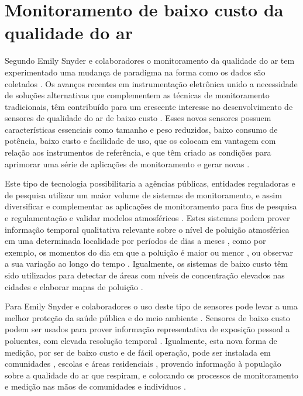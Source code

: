 \section{Monitoramento de baixo custo da qualidade do ar}\label{section:low-cost-air-quality-monit}

Segundo Emily Snyder e colaboradores  o monitoramento da qualidade do ar tem experimentado uma mudança de paradigma na forma como os dados são coletados \cite{Snyder2013}. Os avanços recentes em instrumentação eletrônica unido a necessidade de soluções alternativas que complementem as técnicas de monitoramento tradicionais, têm contribuído para um crescente interesse no desenvolvimento de sensores de qualidade do ar de baixo custo \cite{Kumar2015,Lewis2018Low-costApplications}. Esses novos sensores possuem características essenciais como tamanho e peso reduzidos, baixo consumo de potência, baixo custo e facilidade de uso, que os colocam em vantagem com relação aos instrumentos de referência, e que têm criado as condições para aprimorar uma série de aplicações de monitoramento e gerar novas \cite{Snyder2013,Lewis2018Low-costApplications}.

Este tipo de tecnologia possibilitaria a agências públicas, entidades reguladoras e de pesquisa utilizar um maior volume de sistemas de monitoramento, e assim diversificar e complementar as aplicações de monitoramento para fins de pesquisa e regulamentação e validar modelos atmosféricos \cite{Lewis2018Low-costApplications}. Estes sistemas podem prover informação temporal qualitativa relevante sobre o nível de poluição atmosférica em uma determinada localidade por períodos de dias a meses \cite{Castell2018LocalizedNodes}, como por exemplo, os momentos do dia em que a poluição é maior ou menor \cite{Zimmerman2018AMonitoring}, ou observar a sua variação ao longo do tempo \cite{Castell2017CanEstimates}. Igualmente, os sistemas de baixo custo têm sido utilizados para detectar de áreas com níveis de concentração elevados nas cidades \cite{Mead2013TheNetworks} e elaborar mapas de poluição \cite{Huang2019EstimatingMeasurements}.

Para Emily Snyder e colaboradores o uso deste tipo de sensores pode levar a uma melhor proteção da saúde pública e do meio ambiente \cite{Snyder2013}. Sensores de baixo custo podem ser usados para prover informação representativa de exposição pessoal a poluentes, com elevada resolução temporal \cite{Mead2013TheNetworks,Jerrett2017ValidatingScience}. Igualmente, esta nova forma de medição, por ser de baixo custo e de fácil operação, pode ser instalada em comunidades \cite{Mahajan2020APollution}, escolas e áreas residenciais \cite{Castell2018LocalizedNodes}, provendo informação à população sobre a qualidade do ar que respiram, e colocando os processos de monitoramento e medição nas mãos de comunidades e indivíduos \cite{Lewis2018Low-costApplications}.

